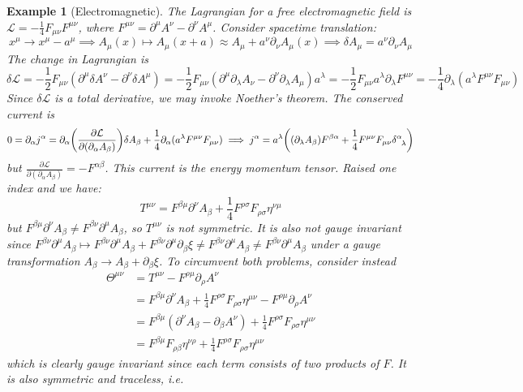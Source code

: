 \documentclass[a4paper]{article}
\newtheorem{eg}{Example}[section]
\theoremstyle{new}
\begin{document}
\begin{eg}[Electromagnetic]
The Lagrangian for a free electromagnetic field is $\mathcal{L}=-\frac{1}{4}F_{\mu\nu}F^{\mu\nu}$, where $F^{\mu\nu}=\partial^\mu A^\nu-\partial^\nu A^\mu$. Consider spacetime translation:
$$x^\mu\rightarrow x^\mu-a^\mu\implies A_\mu(x)\mapsto A_\mu(x+a)\approx A_\mu+a^\nu\partial_\nu A_\mu(x)\implies\delta A_\mu=a^\nu\partial_\nu A_\mu$$
The change in Lagrangian is
$$\delta\mathcal{L}=-\frac{1}{2}F_{\mu\nu}(\partial^\mu\delta A^\nu-\partial^\nu\delta A^\mu)=-\frac{1}{2}F_{\mu\nu}(\partial^\mu\partial_\lambda A_\nu-\partial^\nu\partial_\lambda A_\mu)a^\lambda=-\frac{1}{2}F_{\mu\nu}a^\lambda\partial_\lambda F^{\mu\nu}=-\frac{1}{4}\partial_\lambda(a^\lambda F^{\mu\nu}F_{\mu\nu})$$
Since $\delta\mathcal{L}$ is a total derivative, we may invoke Noether's theorem. The conserved current is
$$0=\partial_\alpha j^\alpha=\partial_\alpha\bigg(\frac{\partial\mathcal{L}}{\partial(\partial_\alpha A_\beta)}\bigg)\delta A_\beta+\frac{1}{4}\partial_\alpha(a^\lambda F^{\mu\nu}F_{\mu\nu})\implies j^\alpha=a^\lambda\bigg((\partial_\lambda A_\beta)F^{\beta\alpha}+\frac{1}{4}F^{\mu\nu}F_{\mu\nu}\tensor*{\delta}{*_{}^{\alpha}_{\lambda}}\bigg)$$
but $\frac{\partial\mathcal{L}}{\partial(\partial_\alpha A_\beta)}=-F^{\alpha\beta}$. This current is the energy momentum tensor. Raised one index and we have:
$$T^{\mu\nu}=F^{\beta\mu}\partial^\nu A_\beta+\frac{1}{4}F^{\rho\sigma}F_{\rho\sigma}\eta^{\nu\mu}$$
but $F^{\beta\mu}\partial^\nu A_\beta\neq F^{\beta\nu}\partial^\mu A_\beta$, so $T^{\mu\nu}$ is not symmetric. It is also not gauge invariant since $F^{\beta\nu}\partial^\mu A_\beta\mapsto F^{\beta\nu}\partial^\mu A_\beta+F^{\beta\nu}\partial^\mu\partial_\beta\xi\neq F^{\beta\nu}\partial^\mu A_\beta\neq F^{\beta\nu}\partial^\mu A_\beta$ under a gauge transformation $A_\beta\rightarrow A_\beta+\partial_\beta\xi$. To circumvent both problems, consider instead
\begin{align}
\Theta^{\mu\nu}&=T^{\mu\nu}-F^{\rho\mu}\partial_\rho A^\nu\nonumber\\&=F^{\beta\mu}\partial^\nu A_\beta+\frac{1}{4}F^{\rho\sigma}F_{\rho\sigma}\eta^{\mu\nu}-F^{\rho\mu}\partial_\rho A^\nu\nonumber\\&=F^{\beta\mu}(\partial^\nu A_\beta-\partial_\beta A^\nu)+\frac{1}{4}F^{\rho\sigma}F_{\rho\sigma}\eta^{\mu\nu}\nonumber\\&=F^{\beta\mu}F_{\rho\beta}\eta^{\nu\rho}+\frac{1}{4}F^{\rho\sigma}F_{\rho\sigma}\eta^{\mu\nu}\nonumber
\end{align}
which is clearly gauge invariant since each term consists of two products of $F$. It is also symmetric and traceless, i.e.

\end{eg}
\end{document}
